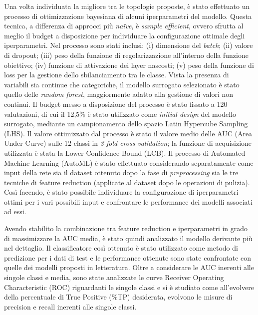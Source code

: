 Una volta individuata la migliore tra le topologie proposte, è stato effettuato un processo di ottimizzazione bayesiana di alcuni iperparametri del modello. 
Questa tecnica, a differenza di approcci più \textit{na\"ive}, è \textit{sample efficient}, ovvero sfrutta al meglio il budget a disposizione per individuare la configurazione ottimale degli iperparametri. 
Nel processo sono stati inclusi: (i) dimensione del \textit{batch}; (ii) valore di dropout; (iii) peso della funzione di regolarizzazione all'interno della funzione obiettivo; (iv) funzione di attivazione dei layer nascosti; (v) peso della funzione di loss per la gestione dello sbilanciamento tra le classe.
Vista la presenza di variabili sia continue che categoriche, il modello surrogato selezionato è stato quello delle \textit{random forest}, maggiormente adatto alla gestione di valori non continui. 
Il budget messo a disposizione del processo è stato fissato a 120 valutazioni, di cui il 12,5\% è stato utilizzato come \textit{initial design} del modello surrogato, mediante un campionamento dello spazio Latin Hypercube Sampling (LHS). 
Il valore ottimizzato dal processo è stato il valore medio delle AUC (Area Under Curve) sulle $12$ classi in \textit{3-fold cross validation}; la funzione di acquisizione utilizzata è stata la Lower Confidence Bound (LCB).
Il processo di Automated Machine Learning (AutoML) è stato effettuato considerando separatamente come input della rete sia il dataset ottenuto dopo la fase di \textit{preprocessing} sia le tre tecniche di feature reduction (applicate al dataset dopo le operazioni di pulizia).
Così facendo, è stato possibile individuare la configurazione di iperparametri ottimi per i vari possibili input e confrontare le performance dei modelli associati ad essi.

Avendo stabilito la combinazione tra feature reduction e iperparametri in grado di massimizzare la AUC media, è stato quindi analizzato il modello derivante più nel dettaglio.
Il classificatore così ottenuto è stato utilizzato come metodo di predizione per i dati di test e le performance ottenute sono state confrontate con quelle dei modelli proposti in letteratura.
Oltre a considerare le AUC inerenti alle singole classi e media, sono state analizzate le curve Receiver Operating Characteristic (ROC) riguardanti le singole classi e si è studiato come all'evolvere della percentuale di True Positive (\%TP) desiderata, evolvono le misure di precision e recall inerenti alle singole classi.
